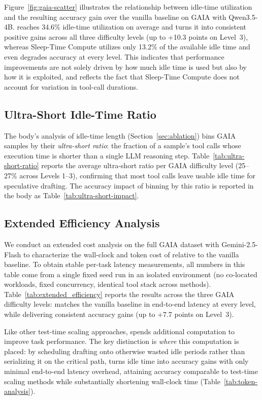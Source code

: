 Figure~\ref{fig:gaia-scatter} illustrates the relationship between idle-time utilization and the resulting accuracy gain over the vanilla baseline on GAIA with Qwen3.5-4B. \methodname{} reaches 34.6\% idle-time utilization on average and turns it into consistent positive gains across all three difficulty levels (up to +10.3 points on Level~3), whereas Sleep-Time Compute utilizes only 13.2\% of the available idle time and even degrades accuracy at every level. This indicates that performance improvements are not solely driven by how much idle time is used but also by how it is exploited, and reflects the fact that Sleep-Time Compute does not account for variation in tool-call durations.

\subsection{Ultra-Short Idle-Time Ratio}
\label{sec:appendix_idle_length}
The body's analysis of idle-time length (Section~\ref{sec:ablation}) bins
GAIA samples by their \emph{ultra-short ratio}: the fraction of a
sample's tool calls whose execution time is shorter than a single LLM
reasoning step. Table~\ref{tab:ultra-short-ratio} reports the average
ultra-short ratio per GAIA difficulty level (25--27\% across Levels 1--3),
confirming that most tool calls leave usable idle time for speculative
drafting. The accuracy impact of binning by this ratio is reported in
the body as Table~\ref{tab:ultra-short-impact}.

\subsection{Extended Efficiency Analysis}
\label{sec:appendix_extended_cost}
We conduct an extended cost analysis on the full GAIA dataset with Gemini-2.5-Flash to characterize the wall-clock and token cost of \methodname relative to the vanilla baseline. To obtain stable per-task latency measurements, all numbers in this table come from a single fixed seed run in an isolated environment (no co-located workloads, fixed concurrency, identical tool stack across methods). Table~\ref{tab:extended_efficiency} reports the results across the three GAIA difficulty levels: \methodname matches the vanilla baseline in end-to-end latency at every level, while delivering consistent accuracy gains (up to +7.7 points on Level~3).

Like other test-time scaling approaches, \methodname spends additional computation to improve task performance. The key distinction is \emph{where} this computation is placed: by scheduling drafting onto otherwise wasted idle periods rather than serializing it on the critical path, \methodname turns idle time into accuracy gains with only minimal end-to-end latency overhead, attaining accuracy comparable to test-time scaling methods while substantially shortening wall-clock time (Table~\ref{tab:token-analysis}).

